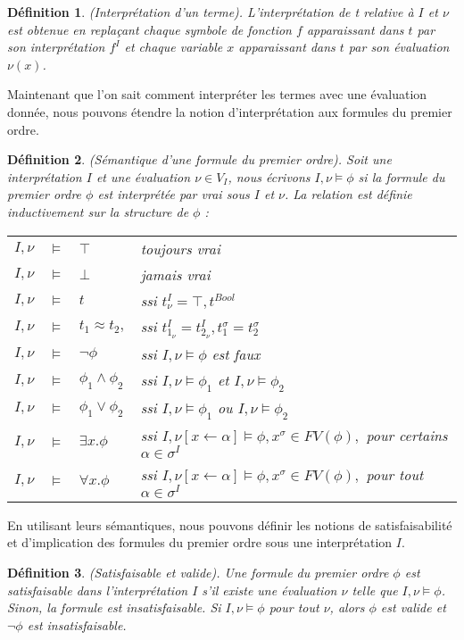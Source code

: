 \documentclass[11pt,openany]{article}
\newtheorem{definition}{D\'efinition}[subsection]
\begin{document}
\begin{definition}
(Interpr\'etation d'un terme). L'interpr\'etation de t relative \`a $I$ et $\nu$ est obtenue en repla\c{c}ant chaque symbole de fonction $f$ apparaissant dans $t$ par son interpr\'etation $f^{I}$ et chaque variable $x$ apparaissant dans $t$ par son \'evaluation $\nu(x)$.
\end{definition}
Maintenant que l'on sait comment interpr\'eter les termes avec une \'evaluation donn\'ee, nous pouvons \'etendre la notion d'interpr\'etation aux formules du premier ordre.
\begin{definition}
(S\'emantique d'une formule du premier ordre). Soit une interpr\'etation $I$ et une \'evaluation $\nu \in V_{I}$, nous \'ecrivons $I,\nu\models\phi$ si la formule du premier ordre $\phi$ est interpr\'et\'ee par vrai sous $I$ et $\nu$. La relation est d\'efinie inductivement sur la structure de $\phi$ :

\begin{tabular}{rcll}
$I,\nu$ & $\models$ & $\top$ & toujours vrai\\
$I,\nu$ & $\models$ & $\bot$ & jamais vrai\\
$I,\nu$ & $\models$ & $t$ & ssi $t^{I}_{\nu}=\top,t^{Bool}$\\
$I,\nu$ & $\models$ & $t_{1}\approx t_{2},$ & ssi $t^{I}_{1_{\nu}}=t^{I}_{2_{\nu}},t^{\sigma}_{1}=t^{\sigma}_{2}$\\
$I,\nu$ & $\models$ & $\neg\phi$ & ssi $I,\nu\models\phi$ est faux\\
$I,\nu$ & $\models$ & $\phi_{1}\land\phi_{2}$ & ssi $I,\nu\models\phi_{1}$ et $I,\nu\models\phi_{2}$\\
$I,\nu$ & $\models$ & $\phi_{1}\lor\phi_{2}$ & ssi $I,\nu\models\phi_{1}$ ou $I,\nu\models\phi_{2}$\\
$I,\nu$ & $\models$ & $\exists x.\phi$ & ssi $I,\nu[x\leftarrow\alpha]\models\phi, x^{\sigma}\in FV(\phi),$ pour certains $\alpha\in\sigma^{I}$\\
$I,\nu$ & $\models$ & $\forall x.\phi$ & ssi $I,\nu[x\leftarrow\alpha]\models\phi, x^{\sigma}\in FV(\phi),$ pour tout $\alpha\in\sigma^{I}$

\end{tabular}
\end{definition}

En utilisant leurs s\'emantiques, nous pouvons d\'efinir les notions de satisfaisabilit\'e  et d'implication des formules du premier ordre sous une interpr\'etation $I$.

\begin{definition}
(Satisfaisable et valide). Une formule du premier ordre $\phi$ est satisfaisable dans l'interpr\'etation $I$ s'il existe une \'evaluation $\nu$ telle que $I,\nu\models\phi$. Sinon, la formule est insatisfaisable. Si $I,\nu\models\phi$ pour tout $\nu$, alors $\phi$ est valide et $\neg\phi$ est insatisfaisable.
\end{definition}
\end{document}
